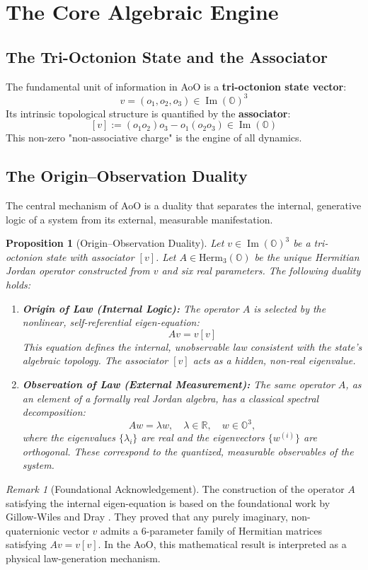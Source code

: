 \documentclass[11pt, a4paper]{article}
\newtheorem{proposition}[theorem]{Proposition}
\theoremstyle{definition}
\theoremstyle{remark}
\newtheorem{remark}[theorem]{Remark}
\begin{document}
\section{The Core Algebraic Engine}

\subsection{The Tri-Octonion State and the Associator}
The fundamental unit of information in AoO is a \textbf{tri-octonion state vector}:
\[ v = (o_1, o_2, o_3) \in \operatorname{Im}(\mathbb{O})^3 \]
Its intrinsic topological structure is quantified by the \textbf{associator}:
\[ [v] := (o_1 o_2) o_3 - o_1 (o_2 o_3) \in \operatorname{Im}(\mathbb{O}) \]
This non-zero "non-associative charge" is the engine of all dynamics.

\subsection{The Origin–Observation Duality}
The central mechanism of AoO is a duality that separates the internal, generative logic of a system from its external, measurable manifestation.

\begin{proposition}[Origin–Observation Duality]
\textit{Let $v \in \operatorname{Im}(\mathbb{O})^3$ be a tri-octonion state with associator $[v]$. Let $A \in \mathrm{Herm}_3(\mathbb{O})$ be the unique Hermitian Jordan operator constructed from $v$ and six real parameters. The following duality holds:}
\begin{enumerate}
    \item \textbf{Origin of Law (Internal Logic):} The operator $A$ is selected by the nonlinear, self-referential eigen-equation:
    \[ A v = v [v] \]
    \textit{This equation defines the internal, unobservable law consistent with the state's algebraic topology. The associator $[v]$ acts as a hidden, non-real eigenvalue.}

    \item \textbf{Observation of Law (External Measurement):} The same operator $A$, as an element of a formally real Jordan algebra, has a classical spectral decomposition:
    \[ A w = \lambda w, \quad \lambda \in \mathbb{R}, \quad w \in \mathbb{O}^3, \]
    \textit{where the eigenvalues $\{\lambda_i\}$ are real and the eigenvectors $\{w^{(i)}\}$ are orthogonal. These correspond to the quantized, measurable observables of the system.}
\end{enumerate}
\end{proposition}
\begin{remark}[Foundational Acknowledgement]
The construction of the operator $A$ satisfying the internal eigen-equation is based on the foundational work by Gillow-Wiles and Dray \cite{GillowDray2009}. They proved that any purely imaginary, non-quaternionic vector $v$ admits a 6-parameter family of Hermitian matrices satisfying $A v = v [v]$. In the AoO, this mathematical result is interpreted as a physical law-generation mechanism.
\end{remark}
\end{document}
